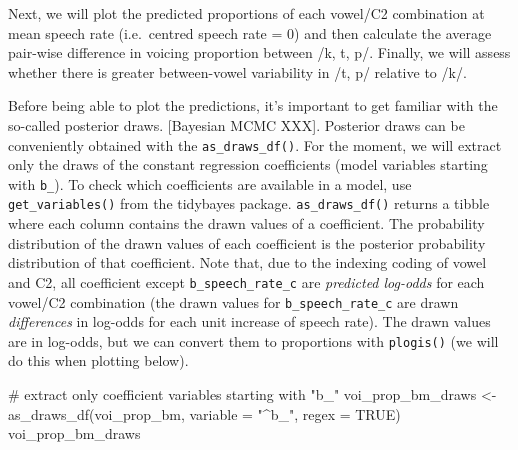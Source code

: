 \documentclass[
  authoryear,
  preprint,
  3p]{elsarticle}
\newenvironment{Shaded}{\begin{snugshade}}{\end{snugshade}}
\newcommand{\AttributeTok}[1]{\textcolor[rgb]{0.40,0.45,0.13}{#1}}
\newcommand{\CommentTok}[1]{\textcolor[rgb]{0.37,0.37,0.37}{#1}}
\newcommand{\ConstantTok}[1]{\textcolor[rgb]{0.56,0.35,0.01}{#1}}
\newcommand{\FunctionTok}[1]{\textcolor[rgb]{0.28,0.35,0.67}{#1}}
\newcommand{\NormalTok}[1]{\textcolor[rgb]{0.00,0.23,0.31}{#1}}
\newcommand{\OtherTok}[1]{\textcolor[rgb]{0.00,0.23,0.31}{#1}}
\newcommand{\StringTok}[1]{\textcolor[rgb]{0.13,0.47,0.30}{#1}}
\begin{document}
Next, we will plot the predicted proportions of each vowel/C2
combination at mean speech rate (i.e.~centred speech rate = 0) and then
calculate the average pair-wise difference in voicing proportion between
/k, t, p/. Finally, we will assess whether there is greater
between-vowel variability in /t, p/ relative to /k/.

Before being able to plot the predictions, it's important to get
familiar with the so-called posterior draws. {[}Bayesian MCMC XXX{]}.
Posterior draws can be conveniently obtained with the
\texttt{as\_draws\_df()}. For the moment, we will extract only the draws
of the constant regression coefficients (model variables starting with
\texttt{b\_}). To check which coefficients are available in a model, use
\texttt{get\_variables()} from the tidybayes package.
\texttt{as\_draws\_df()} returns a tibble where each column contains the
drawn values of a coefficient. The probability distribution of the drawn
values of each coefficient is the posterior probability distribution of
that coefficient. Note that, due to the indexing coding of vowel and C2,
all coefficient except \texttt{b\_speech\_rate\_c} are \emph{predicted
log-odds} for each vowel/C2 combination (the drawn values for
\texttt{b\_speech\_rate\_c} are drawn \emph{differences} in log-odds for
each unit increase of speech rate). The drawn values are in log-odds,
but we can convert them to proportions with \texttt{plogis()} (we will
do this when plotting below).

\begin{Shaded}
\begin{Highlighting}[]
\CommentTok{\# extract only coefficient variables starting with "b\_"}
\NormalTok{voi\_prop\_bm\_draws }\OtherTok{\textless{}{-}} \FunctionTok{as\_draws\_df}\NormalTok{(voi\_prop\_bm, }\AttributeTok{variable =} \StringTok{"\^{}b\_"}\NormalTok{, }\AttributeTok{regex =} \ConstantTok{TRUE}\NormalTok{)}
\NormalTok{voi\_prop\_bm\_draws}
\end{Highlighting}
\end{Shaded}
\end{document}
